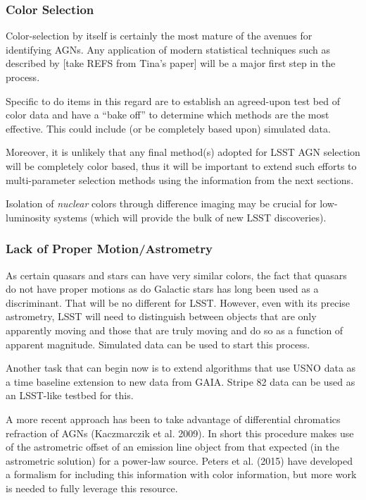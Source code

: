 \subsubsection{Color Selection}

Color-selection by itself is certainly the most mature of the avenues
for identifying AGNs.  Any application of modern statistical
techniques such as described by [take REFS from Tina's paper] will be
a major first step in the process.  

Specific to do items in this regard are to establish an agreed-upon
test bed of color data and have a ``bake off'' to determine which
methods are the most effective.  This could include (or be completely
based upon) simulated data.  

Moreover, it is unlikely that any final method(s) adopted for LSST AGN
selection will be completely color based, thus it will be important to
extend such efforts to multi-parameter selection methods using the
information from the next sections.

Isolation of {\em nuclear} colors through difference imaging may be
crucial for low-luminosity systems (which will provide the bulk of new
LSST discoveries).

\subsubsection{Lack of Proper Motion/Astrometry}

As certain quasars and stars can have very similar colors, the fact
that quasars do not have proper motions as do Galactic stars has long
been used as a discriminant.  That will be no different for LSST.
However, even with its precise astrometry, LSST will need to
distinguish between objects that are only apparently moving and those that
are truly moving and do so as a function of apparent magnitude.
Simulated data can be used to start this process.

Another task that can begin now is to extend algorithms that use USNO
data as a time baseline extension to new data from GAIA.  Stripe 82
data can be used as an LSST-like testbed for this.

A more recent approach has been to take advantage of differential
chromatics refraction of AGNs (Kaczmarczik et al. 2009).  In short
this procedure makes use of the astrometric offset of an emission line
object from that expected (in the astrometric solution) for a
power-law source.  Peters et al. (2015) have developed a formalism for
including this information with color information, but more work is
needed to fully leverage this resource.

